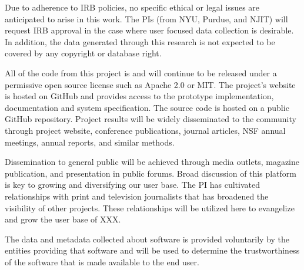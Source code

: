 

 Due to adherence to IRB policies, no specific
ethical or legal issues are anticipated to arise in this work.
The PIs (from NYU, Purdue, and NJIT) will request IRB approval in the case
where user focused data collection is desirable. In addition, the data
generated through this research is not expected to be covered by any
copyright or database right.


\vspace{5pt}
 All of the code from this project is and
will continue to be released under a permissive open source license such
as Apache 2.0 or MIT.
The project's website is hosted on GitHub and provides access to the prototype
implementation, documentation and system specification.
The source code is hosted on a public GitHub repository.
Project results will be widely
disseminated to the community through project website, conference publications,
journal articles, NSF annual meetings, annual reports, and similar methods.

Dissemination to general public will be achieved through media
outlets, magazine publication, and presentation in public forums.
Broad discussion of this platform is key to growing and diversifying our
user base.   The PI has cultivated relationships with print and television
journalists that has broadened the visibility of other projects.   These
relationships will be utilized here to evangelize and grow the user base of
XXX.

The data and metadata collected about software is provided voluntarily by the
entities providing that software and will be used to determine the
trustworthiness of the software that is made available to the end user.


